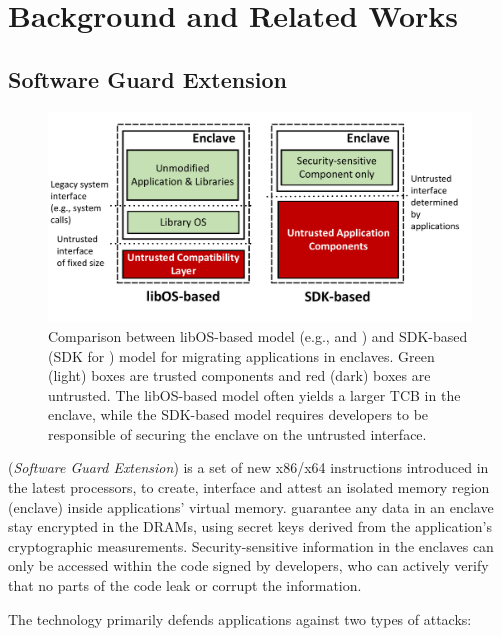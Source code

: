 \section{Background and Related Works}
\label{sec:background}

\subsection{Software Guard Extension}
\label{sec:background:sgx}

\begin{figure}[t!]
\centering
\includegraphics[width=\linewidth]{graphene-sgx/figures/libosvssdk.pdf}
\footnotesize
\vspace{-0.3in}
\caption{
Comparison between libOS-based model (e.g., \haven{} and \sysname{})
and SDK-based (SDK for \sgx{}) model for migrating applications in enclaves.
Green (light) boxes are trusted components and red (dark) boxes are untrusted.
The libOS-based model often yields a larger TCB in the enclave,
while the SDK-based model requires developers to be responsible of
securing the enclave on the untrusted interface.
}
\label{fig:libosvssdk}
\end{figure}

\sgx{} ({\it Software Guard Extension})
is a set of new x86/x64 instructions
introduced in the latest \intel{} \skylake{} processors,
to create, interface and attest
an isolated memory region (enclave) inside applications' virtual memory.
\sgx{} guarantee any data in an enclave
stay encrypted in the DRAMs, using secret keys derived from
the application's cryptographic measurements.
Security-sensitive information in the enclaves
can only be accessed within the code signed by developers,
who can actively verify that no parts of the code
leak or corrupt the information.

The technology primarily defends applications against two types of attacks:

